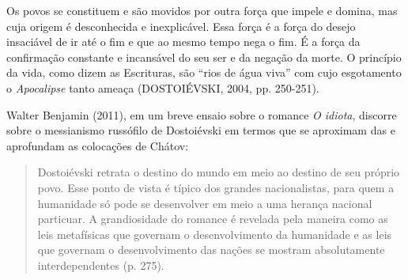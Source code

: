 Os povos se constituem e são movidos por outra força que impele e
domina, mas cuja origem é desconhecida e inexplicável. Essa força é a
força do desejo insaciável de ir até o fim e que ao mesmo tempo nega o
fim. É a força da confirmação constante e incansável do seu ser e da
negação da morte. O princípio da vida, como dizem as Escrituras, são
``rios de água viva'' com cujo esgotamento o \emph{Apocalipse} tanto
ameaça (DOSTOIÉVSKI, 2004, pp. 250-251).

Walter Benjamin (2011), em um breve ensaio sobre o romance \emph{O
idiota}, discorre sobre o messianismo russófilo de Dostoiévski em termos
que se aproximam das e aprofundam as colocações de Chátov:

\begin{quote}
Dostoiévski retrata o destino do mundo em meio ao destino de seu próprio
povo. Esse ponto de vista é típico dos grandes nacionalistas, para quem
a humanidade só pode se desenvolver em meio a uma herança nacional
particuar. A grandiosidade do romance é revelada pela maneira como as
leis metafísicas que governam o desenvolvimento da humanidade e as leis
que governam o desenvolvimento das nações se mostram absolutamente
interdependentes (p. 275).
\end{quote}

